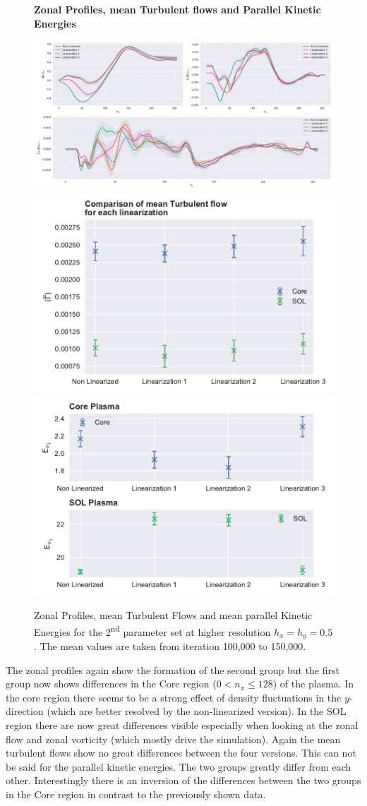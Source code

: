\documentclass[master.tex]{subfiles}
\begin{document}
\begin{figure}[!hbtp]
    \textbf{Zonal Profiles, mean Turbulent flows and Parallel Kinetic Energies}\par\medskip
    \includegraphics[width=\linewidth]{pdfs/0-2_0-06/zonal_profiles_100000.pdf}
    \includegraphics[width=0.5\linewidth]{pdfs/0-2_0-06/turbulent_flow_means_100000.pdf}
    \includegraphics[width=0.5\linewidth]{pdfs/0-2_0-06/parallel_energies_100000.pdf}
    \caption{Zonal Profiles, mean Turbulent Flows and mean parallel Kinetic Energies for the 2\textsuperscript{nd} parameter set at higher resolution $h_x = h_y = 0.5$. The mean values are taken from iteration 100,000 to 150,000.}
    \label{fig:high-resoultion-set}
\end{figure}

The zonal profiles again show the formation of the second group but the first group now shows differences in the Core region ($0 < n_x \leq 128$) of the plasma. In the core region there seems to be a strong effect of density fluctuations in the $y$-direction (which are better resolved by the non-linearized version). In the \ac{SOL} region there are now great differences visible especially when looking at the zonal flow and zonal vorticity (which mostly drive the simulation). Again the mean turbulent flows show no great differences between the four versions. This can not be said for the parallel kinetic energies. The two groups greatly differ from each other. Interestingly there is an inversion of the differences between the two groups in the Core region in contrast to the previously shown data.  
\end{document}

